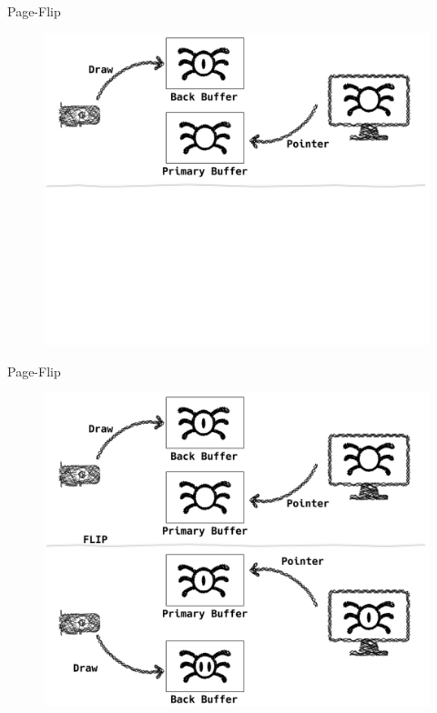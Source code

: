 \documentclass[10pt, compress, aspectratio=169]{beamer}
\begin{document}
\begin{frame}{Page-Flip}
  \begin{figure}
    \centering
    \includegraphics[width=\linewidth,
                     height=0.8\textheight,
                     keepaspectratio]{page-flip_1-min}
  \end{figure}
\end{frame}

\begin{frame}{Page-Flip}
  \begin{figure}
    \centering
    \includegraphics[width=\linewidth,
                     height=0.8\textheight,
                     keepaspectratio]{page-flip-min}
  \end{figure}
\end{frame}
\end{document}
